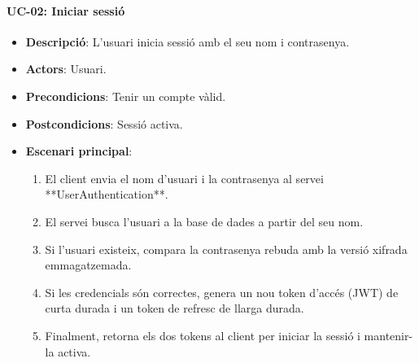 \paragraph{UC-02: Iniciar sessi\'o}
\begin{itemize}
  \item \textbf{Descripció}: L'usuari inicia sessió amb el seu nom i contrasenya.
  \item \textbf{Actors}: Usuari.
  \item \textbf{Precondicions}: Tenir un compte vàlid.
  \item \textbf{Postcondicions}: Sessió activa.
  \item \textbf{Escenari principal}:
    \begin{enumerate}
        \item El client envia el nom d'usuari i la contrasenya al servei **UserAuthentication**.
        \item El servei busca l'usuari a la base de dades a partir del seu nom.
        \item Si l'usuari existeix, compara la contrasenya rebuda amb la versió xifrada emmagatzemada.
        \item Si les credencials són correctes, genera un nou token d'accés (JWT) de curta durada i un token de refresc de llarga durada.
        \item Finalment, retorna els dos tokens al client per iniciar la sessió i mantenir-la activa.
    \end{enumerate}
\end{itemize}

